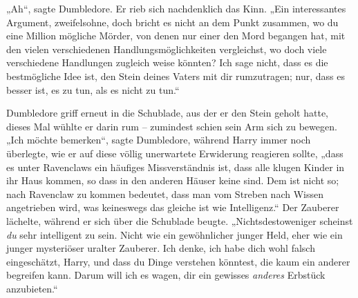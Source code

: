 „Ah“, sagte Dumbledore. Er rieb sich nachdenklich das Kinn. „Ein interessantes Argument, zweifelsohne, doch bricht es nicht an dem Punkt zusammen, wo du eine Million mögliche Mörder, von denen nur einer den Mord begangen hat, mit den vielen verschiedenen Handlungsmöglichkeiten vergleichst, wo doch viele verschiedene Handlungen zugleich weise könnten? Ich sage nicht, dass es die bestmögliche Idee ist, den Stein deines Vaters mit dir rumzutragen; nur, dass es besser ist, es zu tun, als es nicht zu tun.“

Dumbledore griff erneut in die Schublade, aus der er den Stein geholt hatte, dieses Mal wühlte er darin rum – zumindest schien sein Arm sich zu bewegen. „Ich möchte bemerken“, sagte Dumbledore, während Harry immer noch überlegte, wie er auf diese völlig unerwartete Erwiderung reagieren sollte, „dass es unter Ravenclaws ein häufiges Missverständnis ist, dass alle klugen Kinder in ihr Haus kommen, so dass in den anderen Häuser keine sind. Dem ist nicht so; nach Ravenclaw zu kommen bedeutet, dass man vom Streben nach Wissen angetrieben wird, was keineswegs das gleiche ist wie Intelligenz.“ Der Zauberer lächelte, während er sich über die Schublade beugte. „Nichtsdestoweniger scheinst \emph{du} sehr intelligent zu sein. Nicht wie ein gewöhnlicher junger Held, eher wie ein junger mysteriöser uralter Zauberer. Ich denke, ich habe dich wohl falsch eingeschätzt, Harry, und dass du Dinge verstehen könntest, die kaum ein anderer begreifen kann. Darum will ich es wagen, dir ein gewisses \emph{anderes} Erbstück anzubieten.“

